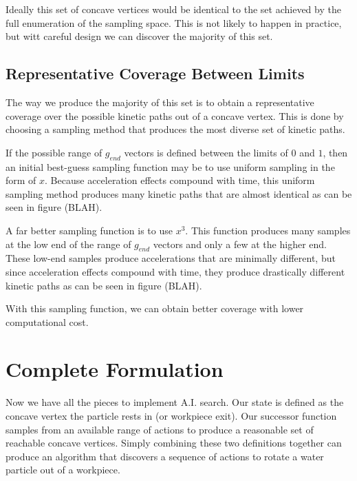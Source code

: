 Ideally this set of concave vertices would be identical to the set achieved by the full enumeration of the sampling space. This is not likely to happen in practice, but witt careful design we can discover the majority of this set.

	\subsection{Representative Coverage Between Limits}

The way we produce the majority of this set is to obtain a representative coverage over the possible kinetic paths out of a concave vertex. This is done by choosing a sampling method that produces the most diverse set of kinetic paths.

If the possible range of $g_{end}$ vectors is defined between the limits of $0$ and $1$, then an initial best-guess sampling function may be to use uniform sampling in the form of $x$. Because acceleration effects compound with time, this uniform sampling method produces many kinetic paths that are almost identical as can be seen in figure (BLAH).


A far better sampling function is to use $x^3$. This function produces many samples at the low end of the range of $g_{end}$ vectors and only a few at the higher end. These low-end samples produce accelerations that are minimally different, but since acceleration effects compound with time, they produce drastically different kinetic paths as can be seen in figure (BLAH).


With this sampling function, we can obtain better coverage with lower computational cost.

	\section{Complete Formulation}

Now we have all the pieces to implement A.I. search. Our state is defined as the concave vertex the particle rests in (or workpiece exit). Our successor function samples from an available range of actions to produce a reasonable set of reachable concave vertices. Simply combining these two definitions together can produce an algorithm that discovers a sequence of actions to rotate a water particle out of a workpiece.

